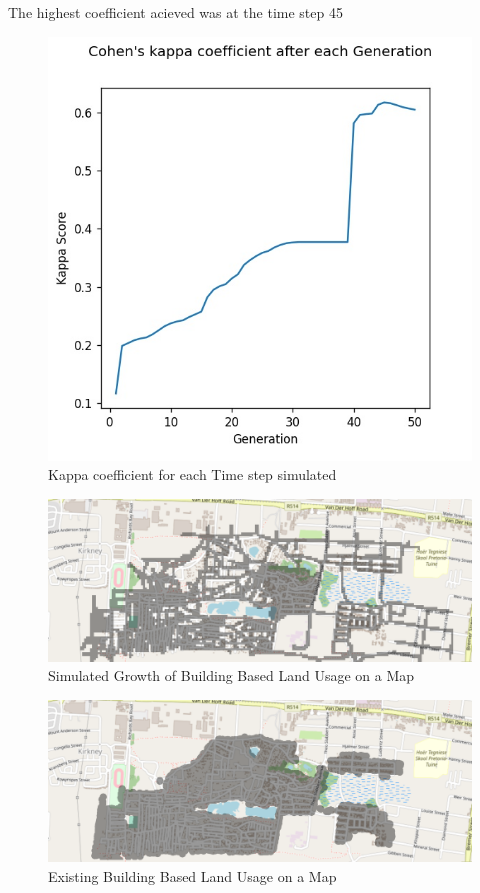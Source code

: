 The highest coefficient acieved was at the time step 45
\begin{figure}[H]
\centering
\includegraphics[scale=0.7]{Figures/Chapter4/scoresFigure}
\caption{Kappa coefficient for each Time step simulated}
\label{fig:scores}
\end{figure}

\begin{figure}[H]
\centering
\includegraphics[scale=0.3,angle=90]{Figures/Chapter4/Simulated}
\caption{Simulated Growth of Building Based Land Usage on a Map}
\label{fig:simmap}
\end{figure}

\begin{figure}[H]
\centering
\includegraphics[scale=0.3,angle=90]{Figures/Chapter4/Actual}
\caption{Existing Building Based Land Usage on a Map}
\label{fig:curmap}
\end{figure}



